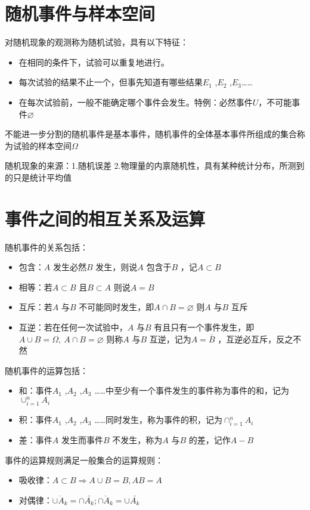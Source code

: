\documentclass[11pt,fleqn]{book} %
\begin{document}
\section{随机事件与样本空间}
对随机现象的观测称为随机试验，具有以下特征：
\begin{itemize}
    \item[\romannumeral1]在相同的条件下，试验可以重复地进行。
    \item[\romannumeral2]每次试验的结果不止一个，但事先知道有哪些结果$ E_1 $ ,$ E_2 $ ,$ E_3 $……
    \item[\romannumeral3]在每次试验前，一般不能确定哪个事件会发生。特例：必然事件$ U $，不可能事件$ \varnothing $
\end{itemize}
\begin{definition}[样本空间]
    不能进一步分割的随机事件是基本事件，随机事件的全体基本事件所组成的集合称为试验的样本空间$ \Omega $  
\end{definition}
随机现象的来源：1.随机误差 2.物理量的内禀随机性，具有某种统计分布，所测到的只是统计平均值

\section{事件之间的相互关系及运算}
随机事件的关系包括：
\begin{itemize}
    \item 包含：$ A $ 发生必然$ B $ 发生，则说$ A $ 包含于$ B $ ，记$ A\subset B $ 
    \item 相等：若$ A\subset B $ 且$ B\subset A $ 则说$ A=B $ 
    \item 互斥：若$ A $ 与$ B $ 不可能同时发生，即$ A\cap B=\varnothing $ 则$ A $ 与$ B $ 互斥
    \item 互逆：若在任何一次试验中，$ A $ 与$ B $ 有且只有一个事件发生，即$ A\cup B=\Omega,~A\cap B=\varnothing $ 则称$ A $ 与$ B $ 互逆，记为$ A=\bar{B} $ ，互逆必互斥，反之不然
\end{itemize}

随机事件的运算包括：
\begin{itemize}
    \item 和：事件$ A_1 $ ,$ A_2 $ ,$ A_3 $ ……中至少有一个事件发生的事件称为事件的和，记为$ \cup_{i=1}^{n}A_i   $  
    \item 积：事件$ A_1 $ ,$ A_2 $ ,$ A_3 $ ……同时发生，称为事件的积，记为$ \cap_{i=1}^{n}A_i   $
    \item 差：事件$ A $ 发生而事件$ B $ 不发生，称为$ A $ 与$ B $ 的差，记作$ A-B $ 
\end{itemize}
事件的运算规则满足一般集合的运算规则：
\begin{itemize}
    \item 吸收律：$ A\subset B\Rightarrow A\cup B=B,AB=A $ 
    \item 对偶律：$ \overline{\cup A_k}=\cap \bar{A_k};\overline{\cap A_k}=\cup \bar{A_k} $ 
\end{itemize}
\end{document}
